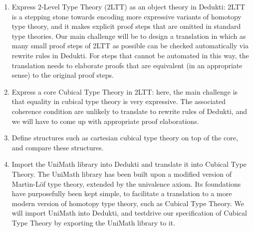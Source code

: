 \begin{enumerate}
\item Express 2-Level Type Theory (2LTT) as an object theory in Dedukti: 2LTT is
  a stepping stone towards encoding more expressive variants of homotopy type
  theory, and it makes explicit proof steps that are omitted in standard type
  theories. Our main challenge will be to design a translation in which as many
  small proof steps of 2LTT as possible can be checked automatically via rewrite
  rules in Dedukti. For steps that cannot be automated in this way, the
  translation needs to elaborate proofs that are equivalent (in an appropriate
  sense) to the original proof steps.
\item Express a core Cubical Type Theory in 2LTT: here, the main challenge is
  that equality in cubical type theory is very expressive. The associated
  coherence condition are unlikely to translate to rewrite rules of Dedukti, and
  we will have to come up with appropriate proof elaborations.
\item Define structures such as cartesian cubical type theory on top of the
  core, and compare these structures.
\item Import the UniMath library into Dedukti and translate it into Cubical Type Theory. The UniMath library has been built upon a modified version of Martin-Löf type theory, extended by the univalence axiom. Its foundations have purposefully been kept simple, to facilitate a translation to a more modern version of homotopy type theory, such as Cubical Type Theory. We will import UniMath into Dedukti, and testdrive our specification of Cubical Type Theory by exporting the UniMath library to it.
\end{enumerate}
